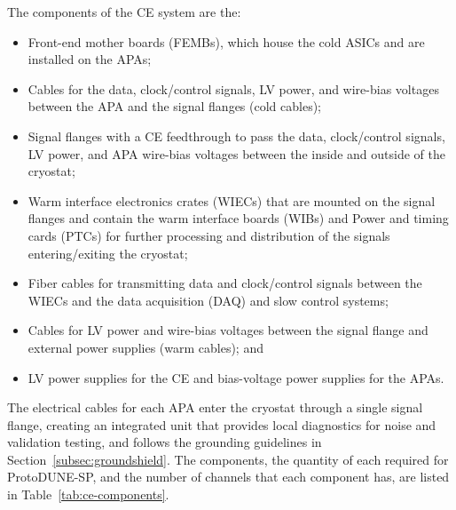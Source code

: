 The components of the CE system are the:
\begin{itemize}
\item Front-end mother boards (FEMBs), which house the cold ASICs and are installed on the APAs;
\item Cables for the data, clock/control signals, LV power, and wire-bias voltages 
between the APA and the signal flanges (cold cables);
\item Signal flanges with a CE feedthrough to pass the data, clock/control signals, 
LV power, and APA wire-bias voltages between the inside and outside of the cryostat;
\item Warm interface electronics crates (WIECs) that are mounted on the signal flanges and contain the warm interface boards (WIBs)
and Power and timing cards (PTCs) for further processing and distribution of the signals entering/exiting the cryostat;
\item Fiber cables for transmitting data and clock/control signals between the WIECs and the data acquisition 
(DAQ) and slow control systems;
\item Cables for LV power and wire-bias voltages between the signal flange and external power supplies (warm cables); and
\item LV power supplies for the CE and bias-voltage power supplies for the APAs.
\end{itemize}

The electrical cables for each APA enter the cryostat through a single 
signal flange, creating an integrated unit that provides local diagnostics for noise and validation testing,
and follows the grounding guidelines in Section~\ref{subsec:groundshield}. The components, the quantity of each required for ProtoDUNE-SP, and the number of channels that each component has, are listed in Table~\ref{tab:ce-components}.

